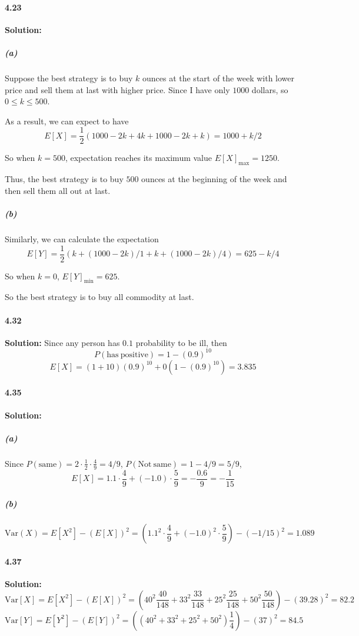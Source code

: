 \documentclass[11pt]{article}
\begin{document}
	\paragraph{4.23}\textbf{Solution:}
		\subparagraph{(a)}
			Suppose the best strategy is to buy $k$ ounces at the start of the week with lower price and sell them at last with higher price. Since I have only $1000$ dollars, so $0 \leq k \leq 500$. 
			
			As a result, we can expect to have \[E[X] = \frac{1}{2}(1000 - 2k + 4k + 1000 - 2k + k) = 1000 + k/2\]
			
			So when $k = 500$, expectation reaches its maximum value $E[X]_{\mathrm{max}} = 1250$.
			
			Thus, the best strategy is to buy $500$ ounces at the beginning of the week and then sell them all out at last.
		\subparagraph{(b)}
			Similarly, we can calculate the expectation
			\[E[Y] = \frac{1}{2}(k + (1000 - 2k)/1 + k + (1000 - 2k)/4) = 625 - k/4\]
			
			So when $k = 0$, $E[Y]_{\mathrm{min}} = 625$. 
			
			So the best strategy is to buy all commodity at last.
	\paragraph{4.32}\textbf{Solution:}
	Since any person has $0.1$ probability to be ill, then
			\[P(\mathrm{has\ positive}) = 1 - (0.9)^{10}\]
			\[E[X] = (1 + 10)(0.9)^{10} + 0(1 - (0.9)^{10}) = 3.835\]
	\paragraph{4.35}\textbf{Solution:}
		\subparagraph{(a)}
			Since $P(\mathrm{same}) = 2\cdot \frac{1}{2} \cdot \frac{4}{9} = 4/9$, $P(\mathrm{Not\ same}) = 1 - 4/9 = 5/9$, \[E[X] = 1.1 \cdot \frac{4}{9} + (-1.0) \cdot \frac{5}{9} = -\frac{0.6}{9} = -\frac{1}{15}\]
		\subparagraph{(b)}
			\[\mathrm{Var}(X) = E[X^2] - (E[X])^2 = (1.1^2 \cdot \frac{4}{9} + (-1.0)^2 \cdot \frac{5}{9}) - (-1/15)^2 = 1.089\]
	\paragraph{4.37}\textbf{Solution:}
		\[\mathrm{Var}[X] = E[X^2] - (E[X])^2 = (40^2 \frac{40}{148} + 33^2 \frac{33}{148} + 25^2 \frac{25}{148} + 50^2 \frac{50}{148}) - (39.28)^2 = 82.2\]
		\[\mathrm{Var}[Y] = E[Y^2] - (E[Y])^2 = ((40^2 + 33^2 + 25^2 + 50^2)\frac{1}{4}) - (37)^2 = 84.5\]
\end{document}
